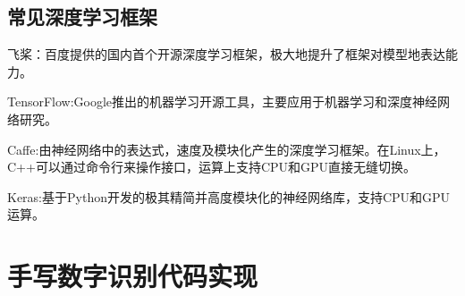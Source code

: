\documentclass[openbib]{article}
\begin{document}
\subsection{常见深度学习框架}
飞桨：百度提供的国内首个开源深度学习框架，极大地提升了框架对模型地表达能力。

TensorFlow:Google推出的机器学习开源工具，主要应用于机器学习和深度神经网络研究。

Caffe:由神经网络中的表达式，速度及模块化产生的深度学习框架。在Linux上，C++可以通过命令行来操作接口，运算上支持CPU和GPU直接无缝切换。

Keras:基于Python开发的极其精简并高度模块化的神经网络库，支持CPU和GPU运算。

\section{手写数字识别代码实现}
\end{document}
